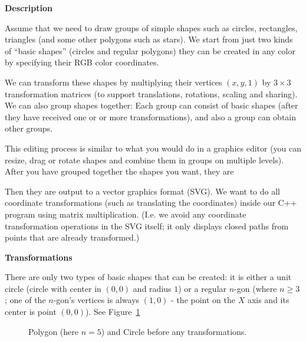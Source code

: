 \documentclass[11pt]{article}
\begin{document}
\vspace{20pt}
{\bf \large Description}

Assume that we need to draw groups of simple shapes such as circles, 
rectangles, triangles (and some other polygons such as stars).
We start from just two kinds of ``basic shapes'' 
(circles and regular polygons) \textendash{} they can be created 
in any color by specifying their RGB color coordinates. 

We can transform 
these shapes by multiplying their vertices $(x,y,1)$
by $3 \times 3$ transformation matrices 
(to support translations, rotations, scaling and sharing). 
We can also group shapes together: Each group can consist of basic shapes
(after they have received one or or more transformations), 
and also a group can obtain other groups. 

This editing process is similar to what you would do in a  
graphics editor (you can resize, drag or rotate shapes and combine them 
in groups on multiple levels). After you have grouped together the shapes 
you want, they are 


Then they are output to a vector graphics format (SVG). 
We want to do all coordinate transformations (such as translating 
the coordinates) inside our C++ program using matrix multiplication. 
(I.e. we avoid any coordinate transformation operations in the SVG itself; 
it only displays closed paths from points that are already transformed.)


\vspace{20pt}
{\bf \large Transformations}

There are only two types of basic shapes that can be created: it is either 
a unit circle (circle with center in $(0,0)$ and radius $1$) or 
a regular $n$-gon (where $n \geq 3$; 
one of the $n$-gon's vertices is always $(1,0)$ - the point on the $X$ axis
and its center is point $(0,0)$). See Figure~\ref{fig:ex06-basic-shapes}


\begin{figure}[!htb]
\caption{\label{fig:ex06-basic-shapes} Polygon (here $n=5$) and Circle before any transformations.}
\end{figure}
\end{document}
